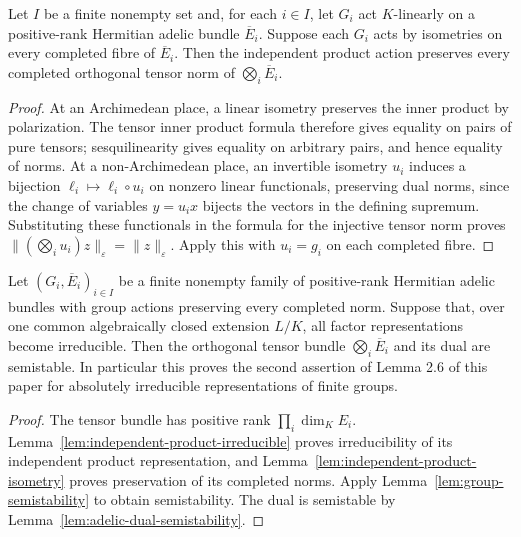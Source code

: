 \begin{lemma}
\label{lem:independent-product-isometry}
\leanok
Let $I$ be a finite nonempty set and, for each $i\in I$, let $G_i$ act
$K$-linearly on a positive-rank Hermitian adelic bundle $\overline E_i$.
Suppose each $G_i$ acts by isometries on every completed fibre of
$\overline E_i$. Then the independent product action preserves every
completed orthogonal tensor norm of $\bigotimes_i\overline E_i$.
\end{lemma}
\begin{proof}
At an Archimedean place, a linear isometry preserves the inner product
by polarization. The tensor inner product formula therefore gives
equality on pairs of pure tensors; sesquilinearity gives equality on
arbitrary pairs, and hence equality of norms.
At a non-Archimedean place, an invertible isometry $u_i$ induces a
bijection $\ell_i\mapsto\ell_i\circ u_i$ on nonzero linear functionals,
preserving dual norms, since the change of variables $y=u_i x$ bijects
the vectors in the defining supremum. Substituting these functionals
in the formula for the injective tensor norm proves
$\|(\bigotimes_i u_i)z\|_\varepsilon=\|z\|_\varepsilon$.
Apply this with $u_i=g_i$ on each completed fibre.
\end{proof}

\begin{lemma}
\label{lem:independent-group-semistability}
\leanok
Let $(G_i,\overline E_i)_{i\in I}$ be a finite nonempty family of
positive-rank Hermitian adelic bundles with group actions preserving
every completed norm. Suppose that, over one common algebraically
closed extension $L/K$, all factor representations become irreducible.
Then the orthogonal tensor bundle $\bigotimes_i\overline E_i$ and its
dual are semistable. In particular this proves the second assertion of
Lemma 2.6 of this paper for absolutely irreducible representations of
finite groups.
\end{lemma}
\begin{proof}
The tensor bundle has positive rank $\prod_i\dim_K E_i$.
Lemma~\ref{lem:independent-product-irreducible} proves irreducibility
of its independent product representation, and
Lemma~\ref{lem:independent-product-isometry} proves preservation of
its completed norms. Apply Lemma~\ref{lem:group-semistability} to obtain
semistability. The dual is semistable by
Lemma~\ref{lem:adelic-dual-semistability}.
\end{proof}

